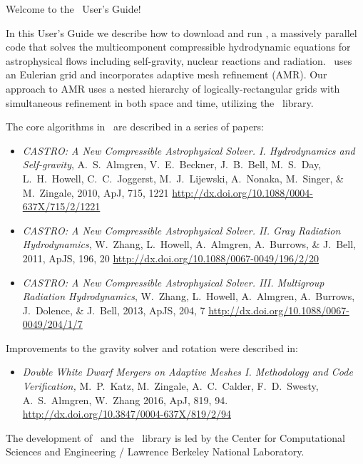 Welcome to the \castro\ User's Guide!

In this User's Guide we describe how to download and run \castro, a
massively parallel code that solves the multicomponent compressible
hydrodynamic equations for astrophysical flows including self-gravity,
nuclear reactions and radiation.  \castro\ uses an Eulerian grid and
incorporates adaptive mesh refinement (AMR).  Our approach to AMR uses
a nested hierarchy of logically-rectangular grids with simultaneous
refinement in both space and time, utilizing the \boxlib\ library.

The core algorithms in \castro\ are described in a series of papers:
\begin{itemize}
\item {\it CASTRO: A New Compressible Astrophysical Solver. I. Hydrodynamics and Self-gravity},
  A.~S.~Almgren, V.~E.~Beckner, J.~B.~Bell, M.~S.~Day, L.~H.~Howell, C.~C.~Joggerst, M.~J.~Lijewski,
  A.~Nonaka, M.~Singer, \& M.~Zingale, 2010, ApJ, 715, 1221\newline
  \url{http://dx.doi.org/10.1088/0004-637X/715/2/1221}

\item {\it CASTRO: A New Compressible Astrophysical Solver. II. Gray Radiation Hydrodynamics},
  W.~Zhang, L.~Howell, A.~Almgren, A.~Burrows, \& J.~Bell, 2011, ApJS, 196, 20\newline
  \url{http://dx.doi.org/10.1088/0067-0049/196/2/20}

\item {\it CASTRO: A New Compressible Astrophysical Solver. III. Multigroup Radiation Hydrodynamics},
  W.~Zhang, L.~Howell, A.~Almgren, A.~Burrows, J.~Dolence, \& J.~Bell, 2013, ApJS, 204, 7\newline
  \url{http://dx.doi.org/10.1088/0067-0049/204/1/7}

\end{itemize}

Improvements to the gravity solver and rotation were described in:
\begin{itemize}
\item {\it Double White Dwarf Mergers on Adaptive Meshes I. Methodology
       and Code Verification, }
  M.~P.~Katz, M.~Zingale, A.~C.~Calder, F.~D.~Swesty, A.~S.~Almgren, W.~Zhang
  2016, ApJ, 819, 94.\newline
  \url{http://dx.doi.org/10.3847/0004-637X/819/2/94}
\end{itemize}

The development of \castro\ and the \boxlib\ library is led by the
Center for Computational Sciences and Engineering / Lawrence Berkeley
National Laboratory.

